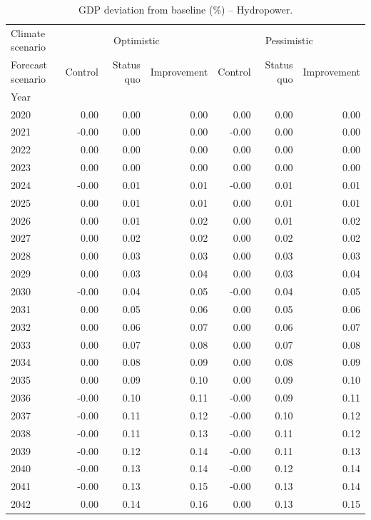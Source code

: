 \begin{table}
\caption{GDP deviation from baseline (\%) -- Hydropower.}
\label{tab:results_HYD_baseline_rel}
\centering
\begin{tabular}{lrrrrrr}
\toprule
Climate scenario & \multicolumn{3}{c}{Optimistic} & \multicolumn{3}{c}{Pessimistic} \\
Forecast scenario & Control & Status quo & Improvement & Control & Status quo & Improvement \\
Year &  &  &  &  &  &  \\
\midrule
2020 & 0.00 & 0.00 & 0.00 & 0.00 & 0.00 & 0.00 \\
2021 & -0.00 & 0.00 & 0.00 & -0.00 & 0.00 & 0.00 \\
2022 & 0.00 & 0.00 & 0.00 & 0.00 & 0.00 & 0.00 \\
2023 & 0.00 & 0.00 & 0.00 & 0.00 & 0.00 & 0.00 \\
2024 & -0.00 & 0.01 & 0.01 & -0.00 & 0.01 & 0.01 \\
2025 & 0.00 & 0.01 & 0.01 & 0.00 & 0.01 & 0.01 \\
2026 & 0.00 & 0.01 & 0.02 & 0.00 & 0.01 & 0.02 \\
2027 & 0.00 & 0.02 & 0.02 & 0.00 & 0.02 & 0.02 \\
2028 & 0.00 & 0.03 & 0.03 & 0.00 & 0.03 & 0.03 \\
2029 & 0.00 & 0.03 & 0.04 & 0.00 & 0.03 & 0.04 \\
2030 & -0.00 & 0.04 & 0.05 & -0.00 & 0.04 & 0.05 \\
2031 & 0.00 & 0.05 & 0.06 & 0.00 & 0.05 & 0.06 \\
2032 & 0.00 & 0.06 & 0.07 & 0.00 & 0.06 & 0.07 \\
2033 & 0.00 & 0.07 & 0.08 & 0.00 & 0.07 & 0.08 \\
2034 & 0.00 & 0.08 & 0.09 & 0.00 & 0.08 & 0.09 \\
2035 & 0.00 & 0.09 & 0.10 & 0.00 & 0.09 & 0.10 \\
2036 & -0.00 & 0.10 & 0.11 & -0.00 & 0.09 & 0.11 \\
2037 & -0.00 & 0.11 & 0.12 & -0.00 & 0.10 & 0.12 \\
2038 & -0.00 & 0.11 & 0.13 & -0.00 & 0.11 & 0.12 \\
2039 & -0.00 & 0.12 & 0.14 & -0.00 & 0.11 & 0.13 \\
2040 & -0.00 & 0.13 & 0.14 & -0.00 & 0.12 & 0.14 \\
2041 & -0.00 & 0.13 & 0.15 & -0.00 & 0.13 & 0.14 \\
2042 & 0.00 & 0.14 & 0.16 & 0.00 & 0.13 & 0.15 \\

\end{tabular}
\end{table}
